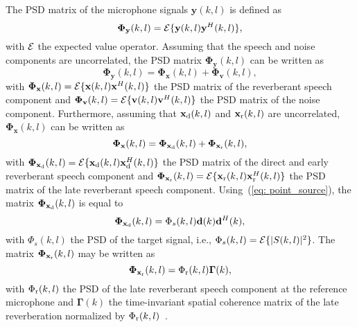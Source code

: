 \documentclass[10pt]{IEEEtran}
\begin{document}
The PSD matrix of the microphone signals $\mathbf{y}(k,l)$ is defined as
\begin{equation}
\boldsymbol{\Phi}_{\mathbf{y}}(k,l) = {\cal{E}} \{\mathbf{y}(k,l)\mathbf{y}^H(k,l) \},
\end{equation}
with ${\cal{E}}$ the expected value operator.
Assuming that the speech and noise components are uncorrelated, the PSD matrix $\boldsymbol{\Phi}_{\mathbf{y}}(k,l)$ can be written as
\begin{equation}
\label{eq: Phi_y}
\boldsymbol{\Phi}_{\mathbf{y}}(k,l) = \boldsymbol{\Phi}_{\mathbf{x}}(k,l) + \boldsymbol{\Phi}_{\mathbf{v}}(k,l),
\end{equation}
with $\boldsymbol{\Phi}_{\mathbf{x}}(k,l) = {\cal{E}}\{\mathbf{x}(k,l)\mathbf{x}^H(k,l) \}$ the PSD matrix of the reverberant speech component and $\boldsymbol{\Phi}_{\mathbf{v}}(k,l) = {\cal{E}}\{\mathbf{v}(k,l)\mathbf{v}^H(k,l) \}$ the PSD matrix of the noise component.
Furthermore, assuming that $\mathbf{x}_{\rm d}(k,l)$ and $\mathbf{x}_{\rm r}(k,l)$ are uncorrelated, $\boldsymbol{\Phi}_{\mathbf{x}}(k,l)$ can be written as
\begin{equation}
\label{eq: Phi_x}
\boldsymbol{\Phi}_{\mathbf{x}}(k,l) = \boldsymbol{\Phi}_{\mathbf{x}_{\rm d}}(k,l) + \boldsymbol{\Phi}_{\mathbf{x}_{\rm r}}(k,l),
\end{equation}
with $\boldsymbol{\Phi}_{\mathbf{x}_{\rm d}}(k,l) = {\cal{E}}\{\mathbf{x}_{\rm d}(k,l)\mathbf{x}_{\rm d}^H(k,l) \}$ the PSD matrix of the direct and early reverberant speech component and $\boldsymbol{\Phi}_{\mathbf{x}_{\rm r}}(k,l) = {\cal{E}}\{\mathbf{x}_{\rm r}(k,l)\mathbf{x}_{\rm r}^H(k,l) \}$ the PSD matrix of the late reverberant speech component.
Using~(\ref{eq: point_source}), the matrix $\boldsymbol{\Phi}_{\mathbf{x}_{\rm d}}(k,l)$ is equal to
\begin{equation}
\label{eq: Phi_xd}
\boldsymbol{\Phi}_{\mathbf{x}_{\rm d}}(k,l) = \Phi_s(k,l)\mathbf{d}(k)\mathbf{d}^H(k),
\end{equation}
with $\Phi_s(k,l)$ the PSD of the target signal, i.e., $\Phi_s(k,l) = {\cal{E}}\{|S(k,l)|^2\}$.
The matrix $\boldsymbol{\Phi}_{\mathbf{x}_{\rm r}}(k,l)$ may be written as
\begin{equation}
\label{eq: Phi_xr}
\boldsymbol{\Phi}_{\mathbf{x}_{\rm r}}(k,l) = \Phi_{\rm r}(k,l)\boldsymbol{\Gamma}(k),
\end{equation}
with $\Phi_{\rm r}(k,l)$ the PSD of the late reverberant speech component at the reference microphone and $\boldsymbol{\Gamma}(k)$ the time-invariant spatial coherence matrix of the late reverberation normalized by $\Phi_{\rm r}(k,l)$~\cite{Braun_EUSIPCO_2013,Kuklasinski_EUSIPCO_2014g,Kuklasinksi_ICASSP_2015,Braun_EURASIP_2015,Schwartz_WASPAA_2015,Schwartz_ICASSP_2016,Kuklasinski_ITASLP_2016,kuklasinski_AES_2016}.
\end{document}
